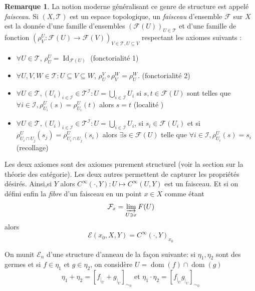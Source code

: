 \documentclass[a4paper,12pt,oneside,titlepage]{article}
\theoremstyle{definition}
\newtheorem{remarque}[definition]{Remarque}
\theoremstyle{plain}
\begin{document}
\begin{remarque}\label{remsheaf}
    La notion moderne généralisant ce genre de structure est appelé \textit{faisceau}.
    Si $(X,\mathcal{T})$ est un espace topologique, un \textit{faisceau} d'ensemble $\mathcal{F}$ sur $X$ est la donnée d'une famille d'ensembles $(\mathcal{F}(U))_{U\in \mathcal{T} }$ et d'une famille de fonction $(\rho^U_V: \mathcal{F}(U)\rightarrow\mathcal{F}(V))_{V\in \mathcal{T}, U\subseteq V}$ respectant les axiomes suivants :
    \begin{itemize}
        \item $\forall U\in\mathcal{T}$, $\rho^U_U = \operatorname{Id}_{\mathcal{F}(U)}$ (fonctorialité 1)
        \item $\forall U,V,W\in\mathcal{T}: U\subseteq V\subseteq W$, $\rho^V_U\circ \rho^W_V=\rho^W_U$. (fonctorialité 2)
        \item $\forall U\in\mathcal{T}, (U_i)_{i\in\mathcal{I}}\in\mathcal{T}^{\mathcal{I}}: U=\bigcup_{i\in\mathcal{I}}U_i$ si $s,t\in\mathcal{F}(U)$ sont telles que \\$ \forall i\in\mathcal{I} ,\rho^U_{U_i}(s)=\rho^U_{U_i}(t)$ alors $s=t$ (localité )
        \item $\forall U\in\mathcal{T}, (U_i)_{i\in\mathcal{I}}\in\mathcal{T}^{\mathcal{I}}: U=\bigcup_{i\in\mathcal{I}}U_i$, si $s_i\in\mathcal{F}(U_i)$ et si $\rho^U_{U_i\cap U_j}(s_j)=\rho^U_{U_i\cap U_j}(s_i)$ alors $\exists s\in\mathcal{F}(U)$ telle que $\forall i\in\mathcal{I},\rho^U_{U_i}(s)=s_i$ (recollage)
    \end{itemize}
    Les deux axiomes sont des axiomes purement structurel (voir la section sur la théorie des catégorie). Les deux autres permettent de capturer les propriétés désirés. Ainsi,si $Y$ alors $C^{\infty}(\cdot,Y): U\mapsto C^{\infty}(U,Y)$ est un faisceau. Et si on défini enfin la \textit{fibre} d'un faisceau en un point $x\in X$ comme étant
    \begin{equation*}
        \mathcal{F}_x=\varinjlim_{U \ni x} F(U)
    \end{equation*}
    alors
    \begin{equation*}
        \mathcal{E}(x_0,X,Y)=C^{\infty}(\cdot,Y)_{x_0}
    \end{equation*} 
\end{remarque}

On munit $\mathcal{E}_n$ d'une structure d'anneau de la façon suivante: si $\eta_1,\eta_2$ sont des germes et si $f\in\eta_1$ et $g\in\eta_2$, on considère $U=\operatorname{dom}(f)\cap \operatorname{dom}(g)$ 
\begin{equation*}
    \eta_1+\eta_2= [f_{|_U}+g_{|_U}]_{\sim_{0}} \text{ et } \eta_1\cdot\eta_2= [f_{|_U}g_{|_U}]_{\sim_{0}}
\end{equation*}
\end{document}

